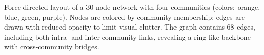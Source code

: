 \caption{Force-directed layout of a 30-node network with four communities (colors: orange, blue, green, purple). Nodes are colored by community membership; edges are drawn with reduced opacity to limit visual clutter. The graph contains 68 edges, including both intra- and inter-community links, revealing a ring-like backbone with cross-community bridges.}
